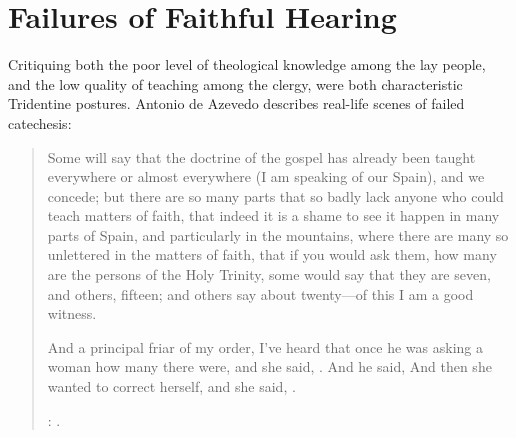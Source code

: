 \section{Failures of Faithful Hearing}

Critiquing both the poor level of theological knowledge among the lay people, and the low quality of teaching among the clergy, were both characteristic Tridentine postures.
Antonio de Azevedo describes real-life scenes of failed catechesis:
\begin{quotation}
Some will say that the doctrine of the gospel has already been taught everywhere or almost everywhere (I am speaking of our Spain), and we concede;
but there are so many parts that so badly lack anyone who could teach matters of faith,
that indeed it is a shame to see it happen in many parts of Spain, and particularly in the  mountains,
where there are many so unlettered  in the matters of faith,
that if you would ask them, how many are the persons of the Holy Trinity, some would say that they are seven, and others, fifteen; and others say about twenty---of this I am a good witness.

And a principal friar of my order, I've heard that once he was asking a woman how many  there were, and she said, .
And he said, 
And then she wanted to correct herself, and she said, .%
  \begin{Footnote}
  \Autocite[26]{Azevedo:Catecismo}:
  .
  \end{Footnote}
\end{quotation}

